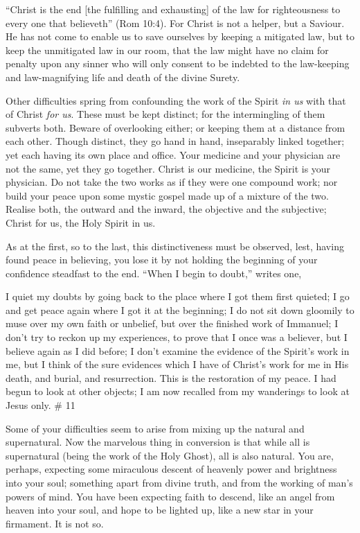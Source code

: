 \documentclass[
]{book}
\begin{document}
``Christ is the end {[}the fulfilling and exhausting{]} of the law for righteousness to every one that believeth'' (Rom 10:4). For Christ is not a helper, but a Saviour. He has not come to enable us to save ourselves by keeping a mitigated law, but to keep the unmitigated law in our room, that the law might have no claim for penalty upon any sinner who will only consent to be indebted to the law-keeping and law-magnifying life and death of the divine Surety.

Other difficulties spring from confounding the work of the Spirit \emph{in us} with that of Christ \emph{for us}. These must be kept distinct; for the intermingling of them subverts both. Beware of overlooking either; or keeping them at a distance from each other. Though distinct, they go hand in hand, inseparably linked together; yet each having its own place and office. Your medicine and your physician are not the same, yet they go together. Christ is our medicine, the Spirit is your physician. Do not take the two works as if they were one compound work; nor build your peace upon some mystic gospel made up of a mixture of the two. Realise both, the outward and the inward, the objective and the subjective; Christ for us, the Holy Spirit in us.

As at the first, so to the last, this distinctiveness must be observed, lest, having found peace in believing, you lose it by not holding the beginning of your confidence steadfast to the end. ``When I begin to doubt,'' writes one,

I quiet my doubts by going back to the place where I got them first quieted; I go and get peace again where I got it at the beginning; I do not sit down gloomily to muse over my own faith or unbelief, but over the finished work of Immanuel; I don't try to reckon up my experiences, to prove that I once was a believer, but I believe again as I did before; I don't examine the evidence of the Spirit's work in me, but I think of the sure evidences which I have of Christ's work for me in His death, and burial, and resurrection. This is the restoration of my peace. I had begun to look at other objects; I am now recalled from my wanderings to look at Jesus only.
\# 11

Some of your difficulties seem to arise from mixing up the natural and supernatural. Now the marvelous thing in conversion is that while all is supernatural (being the work of the Holy Ghost), all is also natural. You are, perhaps, expecting some miraculous descent of heavenly power and brightness into your soul; something apart from divine truth, and from the working of man's powers of mind. You have been expecting faith to descend, like an angel from heaven into your soul, and hope to be lighted up, like a new star in your firmament. It is not so.
\end{document}
